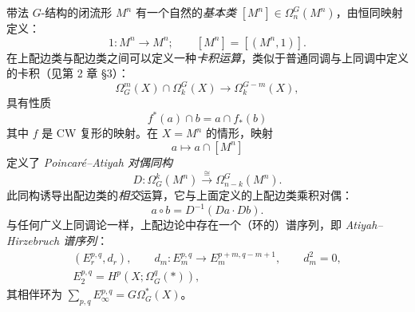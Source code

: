 带法 $G$-结构的闭流形 $M^n$ 有一个自然的\emph{基本类} $[M^n]\in\Omega_n^G(M^n)$，由恒同映射定义：
\[
1:M^n\to M^n;\qquad [M^n]=[(M^n,1)].
\]
在上配边类与配边类之间可以定义一种\emph{卡积运算}，类似于普通同调与上同调中定义的卡积（见第 2 章 §3）：
\[
\Omega_G^m(X)\cap\Omega_k^G(X)\to\Omega_k^{G-m}(X),
\]
具有性质
\[
f^*(a)\cap b=a\cap f_*(b)
\]
其中 $f$ 是 CW 复形的映射。在 $X=M^n$ 的情形，映射
\[
a\mapsto a\cap[M^n]
\]
定义了 \emph{Poincaré--Atiyah 对偶同构}
\[
D:\Omega_G^k(M^n)\xrightarrow{\ \cong\ }\Omega_{n-k}^G(M^n).
\]
此同构诱导出配边类的\emph{相交}运算，它与上面定义的上配边类乘积对偶：
\[
a\circ b=D^{-1}(Da\cdot Db).
\]
与任何广义上同调论一样，上配边论中存在一个（环的）谱序列，即 \emph{Atiyah--Hirzebruch 谱序列}：
\begin{equation}
\begin{gathered}
(E_r^{p,q},d_r),\qquad d_m:E_m^{p,q}\to E_m^{p+m,q-m+1},\qquad d_m^2=0,\\
E_2^{p,q}=H^p(X;\Omega_G^q(*)),
\end{gathered}\tag{9.4}
\end{equation}
其相伴环为 $\sum_{p,q}E_\infty^{p,q}=G\Omega_G^*(X)$。

